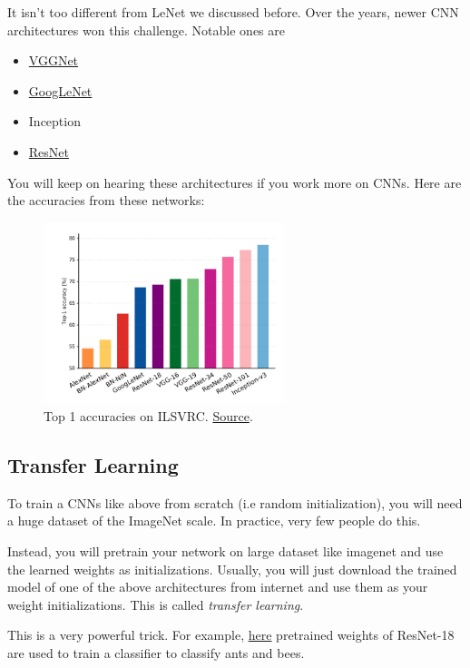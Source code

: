 \documentclass[a4paper]{tufte-handout}
\begin{document}
It isn't too different from LeNet we discussed before. Over the years,
newer CNN architectures won this challenge. Notable ones are

\begin{itemize}
\item
  \href{https://arxiv.org/pdf/1409.1556}{VGGNet}
\item
  \href{https://research.google.com/pubs/pub43022.html}{GoogLeNet}
\item
  Inception
\item
  \href{https://arxiv.org/abs/1512.03385}{ResNet}
\end{itemize}

You will keep on hearing these architectures if you work more on CNNs. Here
are the accuracies from these networks:

\begin{figure}
  \includegraphics[width=70mm]{imagenet-top1.png}
  \caption{Top 1 accuracies on ILSVRC.
\href{https://chaosmail.github.io/deeplearning/2016/10/22/intro-to-deep-learning-for-computer-vision/\#Canziani16}{Source}.
}
\end{figure}

\subsection{Transfer Learning}\label{transfer-learning}

To train a CNNs like above from scratch (i.e random initialization), you
will need a huge dataset of the ImageNet scale. In practice, very few
people do this.

Instead, you will pretrain your network on large dataset like imagenet
and use the learned weights as initializations. Usually, you will just
download the trained model of one of the above architectures from
internet and use them as your weight initializations. This is called
\emph{transfer learning}.

This is a very powerful trick. For example,
\href{http://pytorch.org/tutorials/beginner/transfer_learning_tutorial.html}{here}
pretrained weights of ResNet-18 are used to train a classifier to
classify ants and bees.
\end{document}
